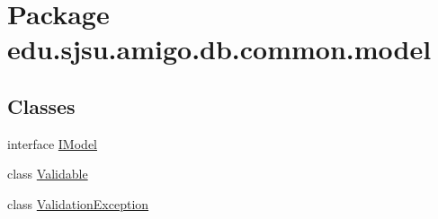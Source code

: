 \hypertarget{namespaceedu_1_1sjsu_1_1amigo_1_1db_1_1common_1_1model}{}\section{Package edu.\+sjsu.\+amigo.\+db.\+common.\+model}
\label{namespaceedu_1_1sjsu_1_1amigo_1_1db_1_1common_1_1model}
\subsection*{Classes}
\begin{DoxyCompactItemize}
\item 
interface \hyperlink{interfaceedu_1_1sjsu_1_1amigo_1_1db_1_1common_1_1model_1_1_i_model}{I\+Model}
\item 
class \hyperlink{classedu_1_1sjsu_1_1amigo_1_1db_1_1common_1_1model_1_1_validable}{Validable}
\item 
class \hyperlink{classedu_1_1sjsu_1_1amigo_1_1db_1_1common_1_1model_1_1_validation_exception}{Validation\+Exception}
\end{DoxyCompactItemize}
